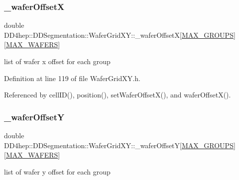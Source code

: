 \subsubsection{\texorpdfstring{\+\_\+wafer\+OffsetX}{\_waferOffsetX}}
{\footnotesize\ttfamily double D\+D4hep\+::\+D\+D\+Segmentation\+::\+Wafer\+Grid\+X\+Y\+::\+\_\+wafer\+OffsetX\mbox{[}\hyperlink{_d_d_segmentation_2include_2_d_d_segmentation_2_wafer_grid_x_y_8h_a36d20ba74425036fd66f863bb89adeda}{M\+A\+X\+\_\+\+G\+R\+O\+U\+PS}\mbox{]}\mbox{[}\hyperlink{_d_d_segmentation_2include_2_d_d_segmentation_2_wafer_grid_x_y_8h_ace2f1e396fdb2a1510290218c8cb476a}{M\+A\+X\+\_\+\+W\+A\+F\+E\+RS}\mbox{]}\hspace{0.3cm}{\ttfamily [protected]}}



list of wafer x offset for each group 



Definition at line 119 of file Wafer\+Grid\+X\+Y.\+h.



Referenced by cell\+I\+D(), position(), set\+Wafer\+Offset\+X(), and wafer\+Offset\+X().

\hypertarget{class_d_d4hep_1_1_d_d_segmentation_1_1_wafer_grid_x_y_a247bd183dfa82726c4d455d4e814622f}{}\label{class_d_d4hep_1_1_d_d_segmentation_1_1_wafer_grid_x_y_a247bd183dfa82726c4d455d4e814622f} 
\subsubsection{\texorpdfstring{\+\_\+wafer\+OffsetY}{\_waferOffsetY}}
{\footnotesize\ttfamily double D\+D4hep\+::\+D\+D\+Segmentation\+::\+Wafer\+Grid\+X\+Y\+::\+\_\+wafer\+OffsetY\mbox{[}\hyperlink{_d_d_segmentation_2include_2_d_d_segmentation_2_wafer_grid_x_y_8h_a36d20ba74425036fd66f863bb89adeda}{M\+A\+X\+\_\+\+G\+R\+O\+U\+PS}\mbox{]}\mbox{[}\hyperlink{_d_d_segmentation_2include_2_d_d_segmentation_2_wafer_grid_x_y_8h_ace2f1e396fdb2a1510290218c8cb476a}{M\+A\+X\+\_\+\+W\+A\+F\+E\+RS}\mbox{]}\hspace{0.3cm}{\ttfamily [protected]}}



list of wafer y offset for each group 



